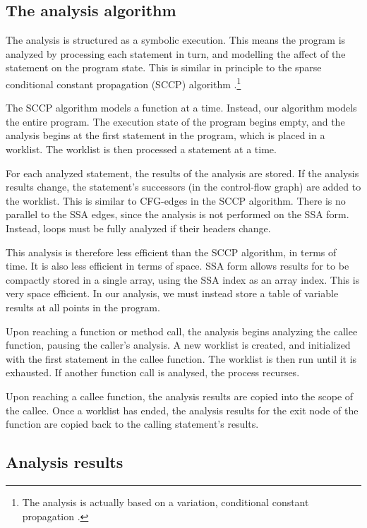 \subsection{The analysis algorithm}
The analysis is structured as a symbolic execution.  This means the
program is analyzed by processing each statement in turn, and
modelling the affect of the statement on the program state.  This is
similar in principle to the sparse conditional constant propagation
(SCCP) algorithm .\footnote{The analysis is actually
  based on a variation, conditional constant propagation
  \cite{Pioli99}.}


The SCCP algorithm models a function at a time.  Instead, our
algorithm models the entire program.  The execution state of the
program begins empty, and the analysis begins at the first statement
in the program, which is placed in a worklist.  The worklist is then
processed a statement at a time.

For each analyzed statement, the results of the analysis are stored.
If the analysis results change, the statement's successors (in the
control-flow graph) are added to the worklist. This is similar to
CFG-edges in the SCCP algorithm.  There is no parallel to the SSA
edges, since the analysis is not performed on the SSA form.  Instead,
loops must be fully analyzed if their headers change.

This analysis is therefore less efficient than the SCCP algorithm, in
terms of time.  It is also less efficient in terms of space.
SSA form allows results for to be compactly stored in a single array,
using the SSA index as an array index.  This is very space efficient.
In our analysis, we must instead store a table of variable results at
all points in the program.

Upon reaching a function or method call, the analysis begins analyzing
the callee function, pausing the caller's analysis.  A new worklist is
created, and initialized with the first statement in the callee
function.  The worklist is then run until it is exhausted.  If another
function call is analysed, the process recurses.

Upon reaching a callee function, the analysis results are copied into
the scope of the callee.  Once a worklist has ended, the analysis
results for the exit node of the function are copied back to the
calling statement's results.

\subsection{Analysis results}

